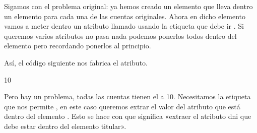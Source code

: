 \documentclass[letterpaper,10pt,spanish]{sphinxmanual}
\begin{document}
Sigamos con el problema original: ya hemos creado un elemento  que lleva dentro un elemento  para cada una de las cuentas originales. Ahora en dicho elemento  vamos a meter dentro un atributo llamado  usando la etiqueta  que debe ir . Si queremos varios atributos no pasa nada podemos ponerlos todos dentro del elemento pero recordando ponerlos al principio.

Así, el código siguiente nos fabrica el atributo.

\begin{sphinxVerbatim}[commandchars=\\\{\}]
 
 
             
                     10
\end{sphinxVerbatim}

Pero hay un problema, todas las cuentas tienen el  a 10. Necesitamos la etiqueta  que nos permite , en este caso queremos extrar el valor del atributo  que está dentro del elemento . Esto se hace con  que significa «extraer el atributo dni que debe estar dentro del elemento titular».
\end{document}
